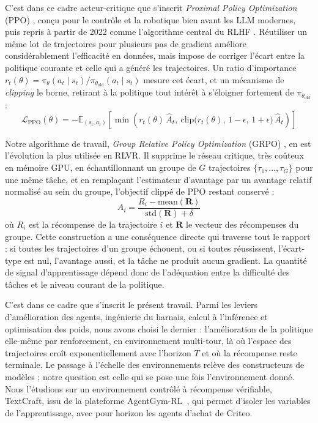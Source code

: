 \documentclass[11pt,a4paper]{article}
\begin{document}
C'est dans ce cadre acteur-critique que s'inscrit \emph{Proximal Policy Optimization} (PPO) \cite{schulman2017proximal}, conçu pour le contrôle et la robotique bien avant les LLM modernes, puis repris à partir de 2022 comme l'algorithme central du RLHF \cite{ouyang2022training}. Réutiliser un même lot de trajectoires pour plusieurs pas de gradient améliore considérablement l'efficacité en données, mais impose de corriger l'écart entre la politique courante et celle qui a généré les trajectoires. Un ratio d'importance $r_t(\theta) = \pi_\theta(a_t \mid s_t) / \pi_{\theta_{\text{old}}}(a_t \mid s_t)$ mesure cet écart, et un mécanisme de \emph{clipping} le borne, retirant à la politique tout intérêt à s'éloigner fortement de $\pi_{\theta_{\text{old}}}$ :
\begin{equation}
\mathcal{L}_{\text{PPO}}(\theta) = -\mathbb{E}_{(s_t, a_t)} \left[ \min\left( r_t(\theta)\, \hat{A}_t, \ \text{clip}\big(r_t(\theta),\, 1-\epsilon,\, 1+\epsilon\big)\, \hat{A}_t \right) \right]
\end{equation}

Notre algorithme de travail, \emph{Group Relative Policy Optimization} (GRPO) \cite{shao2024deepseekmath}, en est l'évolution la plus utilisée en RLVR. Il supprime le réseau critique, très coûteux en mémoire GPU, en échantillonnant un groupe de $G$ trajectoires $\{\tau_1, \dots, \tau_G\}$ pour une même tâche, et en remplaçant l'estimateur d'avantage par un avantage relatif normalisé au sein du groupe, l'objectif clippé de PPO restant conservé :
\begin{equation}
\hat{A}_i = \frac{R_i - \text{mean}(\mathbf{R})}{\text{std}(\mathbf{R}) + \delta}
\end{equation}
où $R_i$ est la récompense de la trajectoire $i$ et $\mathbf{R}$ le vecteur des récompenses du groupe. Cette construction a une conséquence directe qui traverse tout le rapport : si toutes les trajectoires d'un groupe échouent, ou si toutes réussissent, l'écart-type est nul, l'avantage aussi, et la tâche ne produit aucun gradient. La quantité de signal d'apprentissage dépend donc de l'adéquation entre la difficulté des tâches et le niveau courant de la politique.

C'est dans ce cadre que s'inscrit le présent travail. Parmi les leviers d'amélioration des agents, ingénierie du harnais, calcul à l'inférence et optimisation des poids, nous avons choisi le dernier : l'amélioration de la politique elle-même par renforcement, en environnement multi-tour, là où l'espace des trajectoires croît exponentiellement avec l'horizon $T$ et où la récompense reste terminale. Le passage à l'échelle des environnements relève des constructeurs de modèles ; notre question est celle qui se pose une fois l'environnement donné. Nous l'étudions sur un environnement contrôlé à récompense vérifiable, TextCraft, issu de la plateforme AgentGym-RL~\cite{xi_agentgym-rl_2025}, qui permet d'isoler les variables de l'apprentissage, avec pour horizon les agents d'achat de Criteo.
\end{document}
